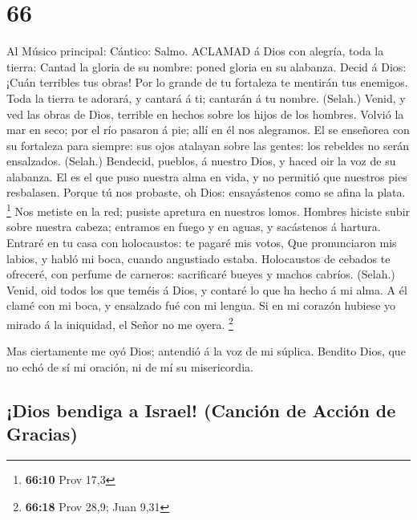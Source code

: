 \hypertarget{section-65}{%
\section{66}\label{section-65}}

 Al Músico principal: Cántico: Salmo. ACLAMAD á Dios con
alegría, toda la tierra:  Cantad la gloria de su nombre:
poned gloria en su alabanza.  Decid á Dios: ¡Cuán terribles
tus obras! Por lo grande de tu fortaleza te mentirán tus enemigos.
 Toda la tierra te adorará, y cantará á ti; cantarán á tu
nombre. (Selah.)  Venid, y ved las obras de Dios, terrible
en hechos sobre los hijos de los hombres.  Volvió la mar en
seco; por el río pasaron á pie; allí en él nos alegramos. 
El se enseñorea con su fortaleza para siempre: sus ojos atalayan sobre
las gentes: los rebeldes no serán ensalzados. (Selah.) 
Bendecid, pueblos, á nuestro Dios, y haced oir la voz de su alabanza.
 El es el que puso nuestra alma en vida, y no permitió que
nuestros pies resbalasen.  Porque tú nos probaste, oh Dios:
ensayástenos como se afina la plata. \footnote{\textbf{66:10} Prov 17,3}
 Nos metiste en la red; pusiste apretura en nuestros lomos.
 Hombres hiciste subir sobre nuestra cabeza; entramos en
fuego y en aguas, y sacástenos á hartura.  Entraré en tu
casa con holocaustos: te pagaré mis votos,  Que
pronunciaron mis labios, y habló mi boca, cuando angustiado estaba.
 Holocaustos de cebados te ofreceré, con perfume de
carneros: sacrificaré bueyes y machos cabríos. (Selah.) 
Venid, oid todos los que teméis á Dios, y contaré lo que ha hecho á mi
alma.  A él clamé con mi boca, y ensalzado fué con mi
lengua.  Si en mi corazón hubiese yo mirado á la iniquidad,
el Señor no me oyera. \footnote{\textbf{66:18} Prov 28,9; Juan 9,31}

 Mas ciertamente me oyó Dios; antendió á la voz de mi
súplica.  Bendito Dios, que no echó de sí mi oración, ni de
mí su misericordia.

\hypertarget{dios-bendiga-a-israel-canciuxf3n-de-acciuxf3n-de-gracias}{%
\subsection{¡Dios bendiga a Israel! (Canción de Acción de
Gracias)}\label{dios-bendiga-a-israel-canciuxf3n-de-acciuxf3n-de-gracias}}

